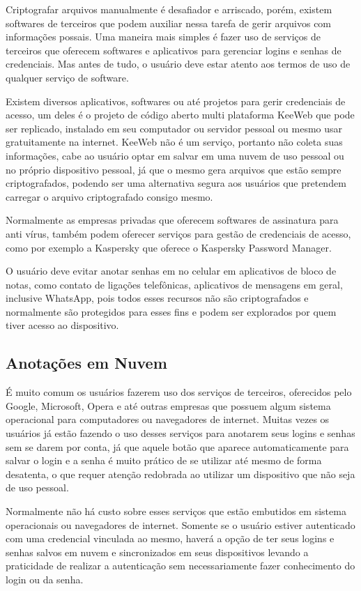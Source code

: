 \documentclass[12pt]{article}
\begin{document}
Criptografar arquivos manualmente é desafiador e arriscado, porém,
existem softwares de terceiros que podem auxiliar nessa tarefa de gerir
arquivos com informações possais.
Uma maneira mais simples é fazer uso de serviços de terceiros que
oferecem softwares e aplicativos para gerenciar logins e senhas de
credenciais.
Mas antes de tudo, o usuário deve estar atento aos termos de uso de
qualquer serviço de software.

Existem diversos aplicativos, softwares ou até projetos para gerir
credenciais de acesso, um deles é o projeto de código aberto multi
plataforma KeeWeb que pode ser replicado, instalado em seu computador ou
servidor pessoal ou mesmo usar gratuitamente na internet.
KeeWeb não é um serviço, portanto não coleta suas informações, cabe ao
usuário optar em salvar em uma nuvem de uso pessoal ou no próprio
dispositivo pessoal, já que o mesmo gera arquivos que estão sempre
criptografados, podendo ser uma alternativa segura aos usuários que
pretendem carregar o arquivo criptografado consigo mesmo.

Normalmente as empresas privadas que oferecem softwares de assinatura
para anti vírus, também podem oferecer serviços para gestão de
credenciais de acesso, como por exemplo a Kaspersky que oferece o
Kaspersky Password Manager.


O usuário deve evitar anotar senhas em no celular em aplicativos de
bloco de notas, como contato de ligações telefônicas, aplicativos de
mensagens em geral, inclusive WhatsApp, pois todos esses recursos não são
criptografados e normalmente são protegidos para esses fins e podem ser
explorados por quem tiver acesso ao dispositivo.

\subsection{Anotações em Nuvem}

É muito comum os usuários fazerem uso dos serviços de terceiros,
oferecidos pelo Google, Microsoft, Opera e até outras empresas que
possuem algum sistema operacional para computadores ou navegadores de
internet.
Muitas vezes os usuários já estão fazendo o uso desses serviços para
anotarem seus logins e senhas sem se darem por conta, já que aquele botão
que aparece automaticamente para salvar o login e a senha é muito prático
de se utilizar até mesmo de forma desatenta, o que requer atenção
redobrada ao utilizar um dispositivo que não seja de uso pessoal.

Normalmente não há custo sobre esses serviços que estão embutidos em
sistema operacionais ou navegadores de internet.
Somente se o usuário estiver autenticado com uma credencial vinculada ao
mesmo, haverá a opção de ter seus logins e senhas salvos em nuvem e
sincronizados em seus dispositivos levando a praticidade de realizar a
autenticação sem necessariamente fazer conhecimento do login ou da senha.
\end{document}
